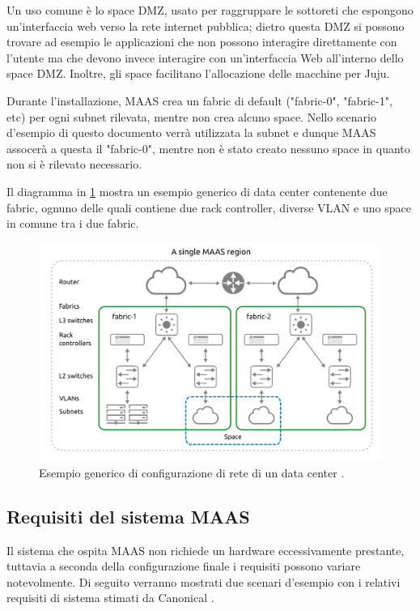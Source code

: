 Un uso comune è lo space DMZ, usato per raggruppare le sottoreti che espongono un'interfaccia web verso la rete internet pubblica; dietro questa DMZ si possono trovare ad esempio le applicazioni che non possono interagire direttamente con l'utente ma che devono invece interagire con un'interfaccia Web all'interno dello space DMZ.
% 
Inoltre, gli space facilitano l'allocazione delle macchine per Juju.

\vfill\break
\vfill\break
\noindent
Durante l'installazione, MAAS crea un fabric di default ("fabric-0", "fabric-1", etc) per ogni subnet rilevata, mentre non crea alcuno space.
% 
Nello scenario d'esempio di questo documento
verrà utilizzata la subnet  e dunque MAAS assocerà a questa il "fabric-0", mentre non è stato creato nessuno space in quanto non si è rilevato necessario.

Il diagramma in \cref{fig:maas_fabric} mostra un esempio generico di data center contenente due fabric, ognuno delle quali contiene due rack controller, diverse VLAN e uno space in comune tra i due fabric.

\begin{figure}[H]
    \centering
    \includegraphics[width=1\linewidth]{tesi/files/immagini/maas/fabric}
    \caption{Esempio generico di configurazione di rete di un data center \cite{maas_glossary}.}
    \label{fig:maas_fabric}
\end{figure}



\subsection{Requisiti del sistema MAAS}
Il sistema che ospita MAAS non richiede un hardware eccessivamente prestante, tuttavia a seconda della configurazione finale i requisiti possono variare notevolmente.
%
Di seguito verranno mostrati due scenari d'esempio con i relativi requisiti di sistema stimati da Canonical \cite{maas_req}.


